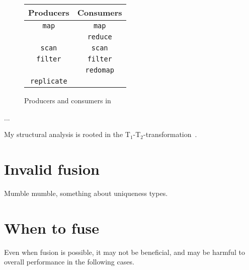 \begin{figure}
  \begin{center}
    \begin{tabular}{c|c}
      \textbf{Producers} & \textbf{Consumers} \\\hline
      \texttt{map} & \texttt{map} \\\hline
      & \texttt{reduce} \\\hline
      \texttt{scan} & \texttt{scan} \\\hline
      \texttt{filter} & \texttt{filter} \\\hline
      & \texttt{redomap} \\\hline
      \texttt{replicate} & \\\hline
    \end{tabular}
  \end{center}
  \caption{Producers and consumers in \LO}
  \label{fig:producers-consumers}
\end{figure}

...

My structural analysis is rooted in the
T$_{1}$-T$_{2}$-transformation~\cite{red_dragon}.

\section{Invalid fusion}
\label{sec:invalidfusion}

Mumble mumble, something about uniqueness types.

\section{When to fuse}
\label{sec:whentofuse}

Even when fusion is possible, it may not be beneficial, and may be
harmful to overall performance in the following cases.

